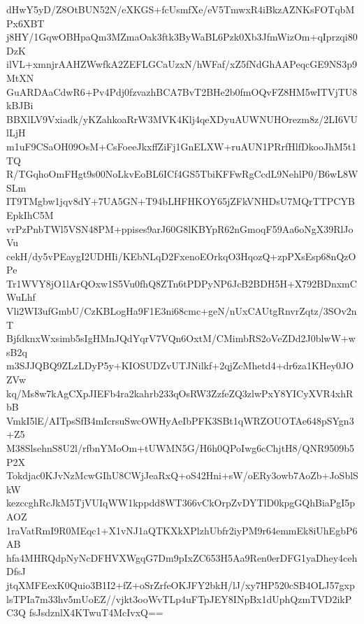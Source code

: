 dHwY5yD/Z8OtBUN52N/eXKGS+fcUsmfXe/eV5TmwxR4iBkzAZNKsFOTqbMPx6XBT
j8HY/1GqwOBHpaQm3MZmaOak3ftk3ByWaBL6Pzk0Xb3JfmWizOm+qIprzqi80DzK
ilVL+xmnjrAAHZWwfkA2ZEFLGCaUzxN/hWFaf/xZ5fNdGhAAPeqcGE9NS3p9MtXN
GuARDAaCdwR6+Pv4Pdj0fzvazhBCA7BvT2BHe2b0fmOQvFZ8HM5wITVjTU8kBJBi
BBXlLV9Vxiadk/yKZahkoaRrW3MVK4Klj4qeXDyuAUWNUHOrezm8z/2LI6VUlLjH
m1uF9CSaOH09OsM+CsFoeeJkxffZiFj1GnELXW+ruAUN1PRrfHlfDkooJhM5t1TQ
R/TGqhoOmFHgt9s00NoLkvEoBL6ICf4GS5TbiKFFwRgCcdL9NehlP0/B6wL8WSLm
IT9TMgbw1jqv8dY+7UA5GN+T94bLHFHKOY65jZFkVNHDsU7MQrTTPCYBEpkIhC5M
vrPzPnbTWl5VSN48PM+ppises9arJ60G8lKBYpR62nGmoqF59Aa6oNgX39RlJoVu
cekH/dy5vPEaygI2UDHIi/KEbNLqD2FxenoEOrkqO3HqozQ+zpPXsEsp68nQzOPe
Tr1WVY8jO1lArQOxw1S5Vu0fhQ8ZTn6tPDPyNP6JcB2BDH5H+X792BDnxmCWuLhf
Vli2WI3ufGmbU/CzKBLogHa9F1E3ni68cmc+geN/nUxCAUtgRnvrZqtz/3SOv2nT
BjfdknxWxsimb5sIgHMnJQdYqrV7VQn6OxtM/CMimbRS2oVeZDd2J0blwW+wsB2q
m3SJJQBQ9ZLzLDyP5y+KIOSUDZvUTJNilkf+2qjZcMhetd4+dr6za1KHey0JOZVw
kq/Ms8w7kAgCXpJIEFb4ra2kahrb233qOsRW3ZzfeZQ3zlwPxY8YICyXVR4xhRbB
VmkI5lE/AITpsSfB4mIcrsuSwcOWHyAeIbPFK3SBt1qWRZOUOTAe648pSYgn3+Z5
M38SlsehnS8U2l/rfbnYMoOm+tUWMN5G/H6h0QPoIwg6cChjtH8/QNR9509b5P2X
Tokdjac0KJvNzMcwGIhU8CWjJeaRxQ+oS42Hni+sW/oERy3owb7AoZb+JoSblSkW
kezccghRcJkM5TjVUIqWW1kppdd8WT366vCkOrpZvDYTlD0kpgGQhBiaPgI5pAOZ
1raVatRmI9R0MEqc1+X1vNJ1aQTKXkXPlzhUbfr2iyPM9r64emmEk8iUhEgbP6AB
hfa4MHRQdpNyNcDFHVXWgqG7Dm9pIxZC653H5Aa9Ren0erDFG1yaDhey4cehDfsJ
jtqXMFEexK0Quio3B1I2+fZ+oSrZrfeOKJFY2bkH/lJ/xy7HP520cSB4OLJ57gxp
lsTPIa7m33hv5mUoEZ//vjkt3ooWvTLp4uFTpJEY8INpBx1dUphQzmTVD2ikPC3Q
fsJsdznlX4KTwuT4McIvxQ==
